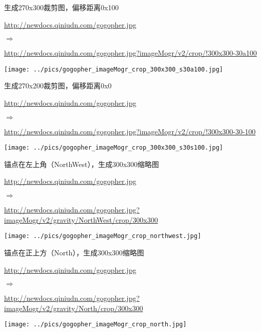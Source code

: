 \documentclass[11pt, oneside]{book}
\newcommand{\qsym}[1]{
\footnotesize
\noindent
#1\par
\normalsize
}
\newcommand{\qsamplelink}[1]{
\vspace{0.2em}
\noindent
#1\par
\vspace{0.1em}
}
\newcommand{\qurl}[1]{\footnotesize\url{#1}\normalsize}
\begin{document}
\begin{sample}
  \caption{生成270x300裁剪图，偏移距离0x100}
    \qsamplelink{\qurl{http://newdocs.qiniudn.com/gogopher.jpg}}
    \qsym{$\Rightarrow$}
    \qsamplelink{\qurl{http://newdocs.qiniudn.com/gogopher.jpg?imageMogr/v2/crop/!300x300-30a100}}

    \begin{center}
      \texttt{[image: ../pics/gogopher\_imageMogr\_crop\_300x300\_s30a100.jpg]}
    \end{center}
  \label{imageMogr-crop-300x300-s30a100}
\end{sample}

\begin{sample}
  \caption{生成270x200裁剪图，偏移距离0x0}
    \qsamplelink{\qurl{http://newdocs.qiniudn.com/gogopher.jpg}}
    \qsym{$\Rightarrow$}
    \qsamplelink{\qurl{http://newdocs.qiniudn.com/gogopher.jpg?imageMogr/v2/crop/!300x300-30-100}}

    \begin{center}
      \texttt{[image: ../pics/gogopher\_imageMogr\_crop\_300x300\_s30s100.jpg]}
    \end{center}
  \label{imageMogr-crop-300x300-s30s100}
\end{sample}

\begin{sample}
  \caption{锚点在左上角（NorthWest），生成300x300缩略图}
    \qsamplelink{\qurl{http://newdocs.qiniudn.com/gogopher.jpg}}
    \qsym{$\Rightarrow$}
    \qsamplelink{\qurl{http://newdocs.qiniudn.com/gogopher.jpg?imageMogr/v2/gravity/NorthWest/crop/300x300}}

    \begin{center}
      \texttt{[image: ../pics/gogopher\_imageMogr\_crop\_northwest.jpg]}
    \end{center}
  \label{imageMogr-crop-northwest}
\end{sample}

\begin{sample}
  \caption{锚点在正上方（North），生成300x300缩略图}
    \qsamplelink{\qurl{http://newdocs.qiniudn.com/gogopher.jpg}}
    \qsym{$\Rightarrow$}
    \qsamplelink{\qurl{http://newdocs.qiniudn.com/gogopher.jpg?imageMogr/v2/gravity/North/crop/300x300}}

    \begin{center}
      \texttt{[image: ../pics/gogopher\_imageMogr\_crop\_north.jpg]}
    \end{center}
  \label{imageMogr-crop-north}
\end{sample}
\end{document}
